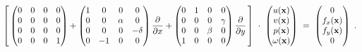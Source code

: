 \begin{equation}
	\left[ \,
	\begin{pmatrix}
		0 & 0 & 0 & 0 \\
		0 & 0 & 0 & 0 \\
		0 & 0 & 0 & 0 \\
		0 & 0 & 0 & 1
	\end{pmatrix} +
	\begin{pmatrix}
		1 & 0 & 0 & 0 \\
		0 & 0 & \alpha & 0 \\
		0 & 0 & 0 & -\delta \\
		0 & -1 & 0 & 0
	\end{pmatrix} \frac{\pd}{\pd x} +
	\begin{pmatrix}
		0 & 1 & 0 & 0 \\
		0 & 0 & 0 & \gamma \\
		0 & 0 & \beta & 0 \\
		1 & 0 & 0 & 0 \\
	\end{pmatrix} \frac{\pd}{\pd y} \, \right]
	\ \cdot \
	\begin{pmatrix}
		u(\mathbf{x}) \\ v(\mathbf{x}) \\ p(\mathbf{x}) \\ \omega(\mathbf{x})
	\end{pmatrix}
	\ = \
	\begin{pmatrix}
		0 \\ f_x(\mathbf{x}) \\ f_y(\mathbf{x}) \\ 0
	\end{pmatrix} \ .
	\vspace{1mm}
\end{equation}